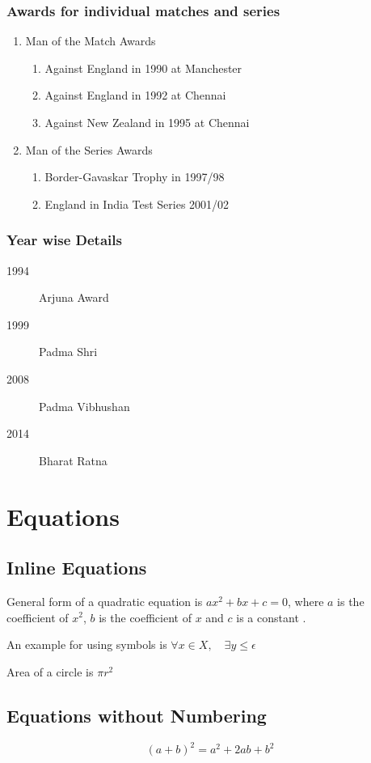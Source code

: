 \documentclass{report}
\begin{document}
	\subsection{Awards for individual matches and series}
	\begin{enumerate}
		\item Man of the Match Awards
		\begin{enumerate}
			\item Against England in 1990 at Manchester
			\item Against England in 1992 at Chennai
			\item Against New Zealand in 1995 at Chennai
		\end{enumerate}
		\item Man of the Series Awards
			\begin{enumerate}
				\item Border-Gavaskar Trophy  in 1997/98
				\item England in India Test Series 2001/02
			\end{enumerate}
	\end{enumerate}
	\subsection{Year wise Details}
	\begin{description}
		\item[1994] Arjuna Award
		\item[1999] Padma Shri 
		\item[2008] Padma Vibhushan
		\item[2014] Bharat Ratna 
	\end{description}

\chapter{Equations}
\section{Inline Equations}
General form of a quadratic equation is $ax^2+bx+c=0$, where $a$ is the coefficient of $x^2$, $b$ is the coefficient of $x$ and $c$ is a constant \cite{latex}.

An example for using symbols is $\forall x \in X, \quad \exists y \leq \epsilon$

Area of a circle is $\pi r^2$
\section{Equations without Numbering}
\begin{displaymath}
(a+b)^2 = a^2+2ab+b^2
\end{displaymath}
\end{document}

